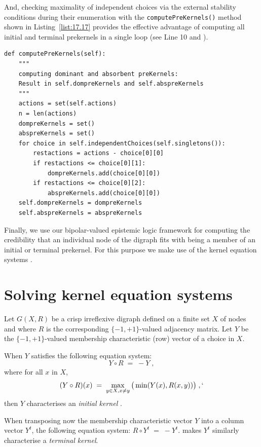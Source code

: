 And, checking maximality of independent choices via the external stability conditions during their enumeration with the \texttt{computePreKernels()} method shown in Listing~\vref{list:17.17} provides the effective advantage of computing all initial and terminal prekernels in a single loop (see Line 10 and \citealp{BIS-2006b}).
\begin{lstlisting}[caption={Computing dominant and absorbent preKernels},label=list:17.17]
def computePreKernels(self):
    """
    computing dominant and absorbent preKernels:
    Result in self.dompreKernels and self.abspreKernels
    """
    actions = set(self.actions)
    n = len(actions)
    dompreKernels = set()
    abspreKernels = set()
    for choice in self.independentChoices(self.singletons()):
        restactions = actions - choice[0][0]
        if restactions <= choice[0][1]:
            dompreKernels.add(choice[0][0])
        if restactions <= choice[0][2]:
            abspreKernels.add(choice[0][0])
    self.dompreKernels = dompreKernels
    self.abspreKernels = abspreKernels
\end{lstlisting}
 
Finally, we use our bipolar-valued epistemic logic framework for computing the credibility that an individual node of the digraph fits with being a member of an initial or terminal prekernel. For this purpose we make use of the kernel equation systems \citep{BER-1958,KIT-1993}.

\section{Solving kernel equation systems}
\label{sec:17.6}

Let $G(X,R)$ be a crisp irreflexive digraph defined on a finite set $X$ of nodes and where $R$ is the corresponding $\{-1,+1\}$-valued adjacency matrix. Let $Y$ be the $\{-1,+1\}$-valued membership characteristic (row) vector of a choice in $X$.

When $Y$ satisfies the following equation system:
\begin{equation}
  Y \circ R \; = \; -Y\;,
\end{equation}
where for all $x$ in $X$,
\begin{equation}\label{eq:17.2}
     (Y \circ R)(x) \; = \; \max_{y \in X, x \neq y} \big ( \min(Y(x), R(x,y))\big)\;,`
\end{equation}
then $Y$ characterises an \emph{initial kernel} \citep*{BIS-2006a,BIS-2006b}.

When transposing now the membership characteristic vector $Y$ into a column vector $Y^t$, the following equation system: $R \circ Y^t \; = \; -Y^t$.
makes $Y^t$ similarly characterise a \emph{terminal kernel}.

